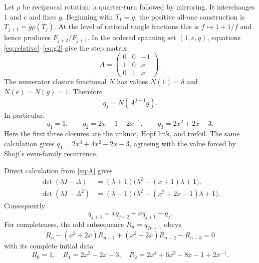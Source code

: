 \documentclass[11pt]{article}
\begin{document}
Let $\rho$ be reciprocal rotation: a quarter-turn followed by mirroring.  It
interchanges $1$ and $e$ and fixes $g$.  Beginning with $T_1=g$, the positive
all-one construction is $T_{j+1}=g\rho(T_j)$.  At the level of rational
tangle fractions this is $f\mapsto1+1/f$ and hence produces
$F_{j+2}/F_{j+1}$.  In the ordered spanning set $(1,e,g)$, equations
\eqref{eq:relative}--\eqref{eq:g2} give the step matrix
\begin{equation}\label{eq:A}
 A=\begin{pmatrix}
       0&0&-1\\
       1&0&x\\
       0&1&x
    \end{pmatrix}.
\end{equation}
The numerator closure functional $N$ has values
$N(1)=\delta$ and $N(e)=N(g)=1$.  Therefore
\begin{equation}\label{eq:closure}
 q_j=N(A^{j-1}g).
\end{equation}
In particular,
\begin{equation}\label{eq:initial}
 q_1=1,\qquad q_2=2x+1-2x^{-1},\qquad
 q_3=2x^2+2x-3.
\end{equation}
Here the first three closures are the unknot, Hopf link, and trefoil.  The
same calculation gives $q_4=2x^3+4x^2-2x-3$, agreeing with the value forced
by Shoji's even-family recurrence.

Direct calculation from \eqref{eq:A} gives
\begin{equation}\label{eq:charpolys}
\begin{aligned}
 \det(\lambda I-A)
   &=(\lambda+1)\bigl(\lambda^2-(x+1)\lambda+1\bigr),\\
 \det(\lambda I-A^2)
   &=(\lambda-1)\bigl(\lambda^2-(x^2+2x-1)\lambda+1\bigr).
\end{aligned}
\end{equation}
Consequently
\begin{equation}\label{eq:fullrec}
 q_{j+3}=xq_{j+2}+xq_{j+1}-q_j.
\end{equation}
For completeness, the odd subsequence $R_n=q_{2n+1}$ obeys
\begin{equation}\label{eq:oddrec}
 R_n-(x^2+2x)R_{n-1}+(x^2+2x)R_{n-2}-R_{n-3}=0
\end{equation}
with its complete initial data
\begin{equation}\label{eq:oddinitial}
 R_0=1,\quad R_1=2x^2+2x-3,\quad
 R_2=2x^4+6x^3-8x-1+2x^{-1}.
\end{equation}
\end{document}

